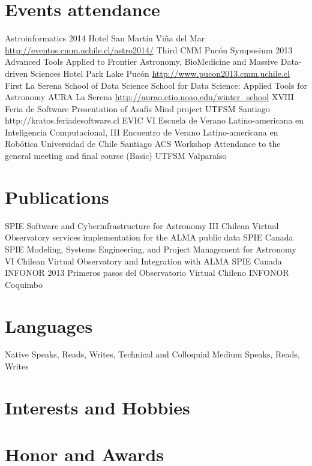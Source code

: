 \documentclass[11pt,a4paper]{moderncv}
\begin{document}
\section{Events attendance}
	{Astroinformatics 2014}
	{}
	{Hotel San Martín}
	{Viña del Mar}
	{\url{http://eventos.cmm.uchile.cl/astro2014/}}
	{Third CMM Pucón Symposium 2013}
	{Advanced Tools Applied to Frontier Astronomy, BioMedicine and Massive Data-driven Sciences}
	{Hotel Park Lake}
	{Pucón}
	{\url{http://www.pucon2013.cmm.uchile.cl}}
	{First La Serena School of Data Science}
	{School for Data Science: Applied Tools for Astronomy}
	{AURA}
	{La Serena}
	{\url{http://aurao.ctio.noao.edu/winter_school}}
	{XVIII Feria de Software}
	{Presentation of Asafis Mind project}
	{UTFSM}
	{Santiago}
	{http://kratos.feriadesoftware.cl}
	{EVIC}
	{VI Escuela de Verano Latino-americana en Inteligencia Computacional, III Encuentro de Verano Latino-americana en Robótica}
	{Universidad de Chile}
	{Santiago}
	{}
	{ACS Workshop}
	{Attendance to the general meeting and final course (Basic)}
	{UTFSM}
	{Valparaíso}
	{}

\section{Publications}
	{SPIE Software and Cyberinfrastructure for Astronomy III}
	{Chilean Virtual Observatory services implementation for the ALMA public data}
	{SPIE}
	{Canada}
	{}
	{SPIE Modeling, Systems Engineering, and Project Management for Astronomy VI}
	{Chilean Virtual Observatory and Integration with ALMA}
	{SPIE}
	{Canada}
	{}
	{INFONOR 2013}
	{Primeros pasos del Observatorio Virtual Chileno}
	{INFONOR}
	{Coquimbo}
	{}

\section{Languages}
	{Native}
	{Speaks, Reads, Writes, Technical and Colloquial}
	{Medium}
	{Speaks, Reads, Writes}

\section{Interests and Hobbies}

\section{Honor and Awards}
\end{document}
